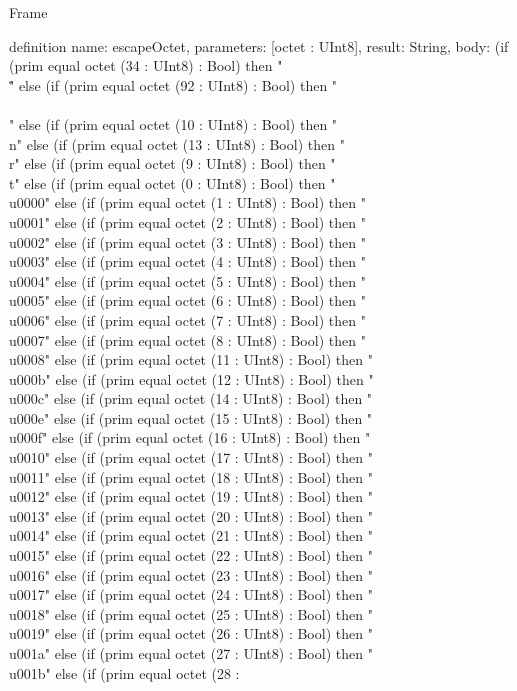 \begin{lexlean}{Frame}
\begin{semanticmodule}
definition{
  name: escapeOctet,
  parameters: [octet : UInt8],
  result: String,
  body: (if (prim equal octet (34 : UInt8) : Bool) then "\\\"" else (if (prim equal octet (92 : UInt8) : Bool) then "\\\\" else (if (prim equal octet (10 : UInt8) : Bool) then "\\n" else (if (prim equal octet (13 : UInt8) : Bool) then "\\r" else (if (prim equal octet (9 : UInt8) : Bool) then "\\t" else (if (prim equal octet (0 : UInt8) : Bool) then "\\u0000" else (if (prim equal octet (1 : UInt8) : Bool) then "\\u0001" else (if (prim equal octet (2 : UInt8) : Bool) then "\\u0002" else (if (prim equal octet (3 : UInt8) : Bool) then "\\u0003" else (if (prim equal octet (4 : UInt8) : Bool) then "\\u0004" else (if (prim equal octet (5 : UInt8) : Bool) then "\\u0005" else (if (prim equal octet (6 : UInt8) : Bool) then "\\u0006" else (if (prim equal octet (7 : UInt8) : Bool) then "\\u0007" else (if (prim equal octet (8 : UInt8) : Bool) then "\\u0008" else (if (prim equal octet (11 : UInt8) : Bool) then "\\u000b" else (if (prim equal octet (12 : UInt8) : Bool) then "\\u000c" else (if (prim equal octet (14 : UInt8) : Bool) then "\\u000e" else (if (prim equal octet (15 : UInt8) : Bool) then "\\u000f" else (if (prim equal octet (16 : UInt8) : Bool) then "\\u0010" else (if (prim equal octet (17 : UInt8) : Bool) then "\\u0011" else (if (prim equal octet (18 : UInt8) : Bool) then "\\u0012" else (if (prim equal octet (19 : UInt8) : Bool) then "\\u0013" else (if (prim equal octet (20 : UInt8) : Bool) then "\\u0014" else (if (prim equal octet (21 : UInt8) : Bool) then "\\u0015" else (if (prim equal octet (22 : UInt8) : Bool) then "\\u0016" else (if (prim equal octet (23 : UInt8) : Bool) then "\\u0017" else (if (prim equal octet (24 : UInt8) : Bool) then "\\u0018" else (if (prim equal octet (25 : UInt8) : Bool) then "\\u0019" else (if (prim equal octet (26 : UInt8) : Bool) then "\\u001a" else (if (prim equal octet (27 : UInt8) : Bool) then "\\u001b" else (if (prim equal octet (28 : }
\end{semanticmodule}
\end{lexlean}
